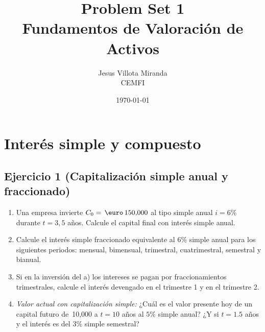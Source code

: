 \documentclass[12pt,a4paper]{article}
\title{\textbf{Problem Set 1}\\\large Fundamentos de Valoración de Activos}
\author{Jesus Villota Miranda\\CEMFI}
\date{\today}
\newenvironment{ejercicio}[1]{\subsection*{Ejercicio #1}}{}
\begin{document}
\section{Interés simple y compuesto}

\begin{ejercicio}{1 (Capitalización simple anual y fraccionado)}
\begin{enumerate}[label=\alph*)]
  \item Una empresa invierte $C_0=\,\text{\euro}\,150{,}000$ al tipo simple anual $i=6\%$ durante $t=3{,}5$ años. Calcule el capital final con interés simple anual.
  \item Calcule el interés simple fraccionado equivalente al 6\% simple anual para los siguientes periodos: mensual, bimensual, trimestral, cuatrimestral, semestral y bianual.
  \item Si en la inversión del a) los intereses se pagan por fraccionamientos trimestrales, calcule el interés devengado en el trimestre 1 y en el trimestre 2.
  \item \textit{Valor actual con capitalización simple:} \; ¿Cuál es el valor presente hoy de un capital futuro de \text{\euro}\,10{,}000 a $t=10$ años al $5\%$ simple anual? ¿Y si $t=1.5$ años y el interés es del 3\% simple semestral?
\end{enumerate}
\end{ejercicio}
\end{document}
